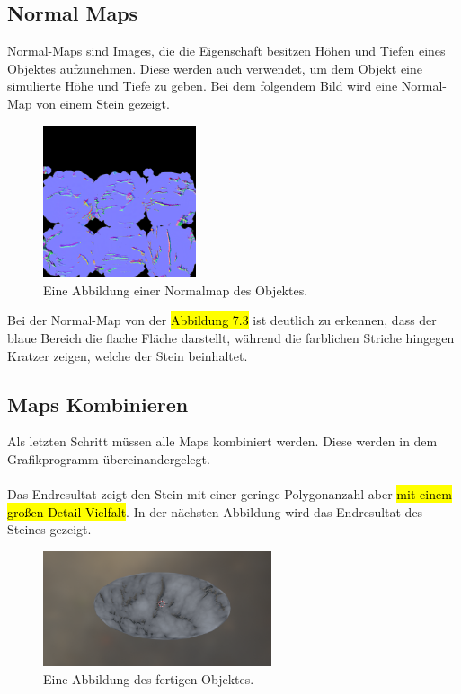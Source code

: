 \subsection{Normal Maps}

Normal-Maps sind Images, die die Eigenschaft besitzen Höhen und Tiefen eines Objektes aufzunehmen. Diese werden auch verwendet, um dem Objekt eine simulierte Höhe und Tiefe zu geben. Bei dem folgendem Bild wird eine Normal-Map von einem Stein gezeigt.

\begin{figure}[H]
    \centering
    \includegraphics[width=0.4\textwidth]{chapters/11/Images/SteinNormal.png}
    \caption{Eine Abbildung einer Normalmap des Objektes.}
    \label{htl01}
\end{figure}
\noindent Bei der Normal-Map von der \hl{Abbildung 7.3} ist deutlich zu erkennen, dass der blaue Bereich die flache Fläche darstellt, während die farblichen Striche hingegen Kratzer zeigen, welche der Stein beinhaltet.

\subsection{Maps Kombinieren}

Als letzten Schritt müssen alle Maps kombiniert werden. Diese werden in dem Grafikprogramm übereinandergelegt.\\\\
Das Endresultat zeigt den Stein mit einer geringe Polygonanzahl aber \hl{mit einem großen Detail Vielfalt}. In der nächsten Abbildung wird das Endresultat des Steines gezeigt.

\begin{figure}[H]
    \centering
    \includegraphics[width=0.6\textwidth]{chapters/11/Images/SteinCombi.png}
    \caption{Eine Abbildung des fertigen Objektes.}
    \label{htl01}
\end{figure}

